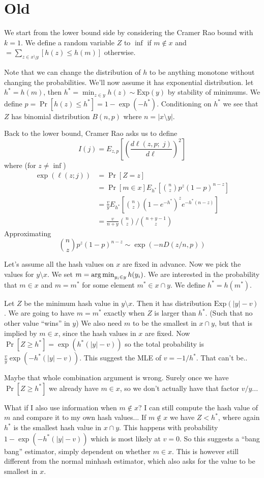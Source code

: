 \section{Old}


We start from the lower bound side by considering the Cramer Rao bound with $k=1$.
We define a random variable $Z$ to $\inf$ if $m\not\in x$ and $
= \sum_{z\in x\setminus y} [h(z) \le h(m)]$ otherwise.

Note that we can change the distribution of $h$ to be anything monotone without changing the probabilities.
We'll now assume it has exponential distribution.
let $h^* = h(m)$, then $h^* = \min_{z\in y}h(z) \sim \text{Exp}(y)$ by stability of minimums.
We define $p=\Pr[h(z)\le h^*] = 1-\exp(-h^*)$.
Conditioning on $h^*$ we see that $Z$ has binomial distribution $B(n,p)$ where $n=|x\setminus y|$.

Back to the lower bound, 
Cramer Rao asks us to define
\[
   I(j) = E_{z,p}\left[\left(\frac{d\ell(z,p;\; j)}{d\ell}\right)^2\right]
\]
where (for $z\not=\inf$)
\begin{align}
   \exp(\ell(z;j))
   &=\Pr[Z=z]
 \\&= \Pr[m\in x]E_{h^*}[\binom{n}{z}p^z(1-p)^{n-z}]
 \\&= \tfrac{v}{y}E_{h^*}[\binom{n}{z} (1-e^{-h^*})^z e^{-h^*(n-z)}]
 \\&= \frac{v}{n+y}\binom{n}{z}\bigg/\binom{n+y-1}{z}
\end{align}
Approximating
\[
   \binom{n}{z}p^z(1-p)^{n-z} \sim \exp(-n D(z/n, p))
\]


Let's assume all the hash values on $x$ are fixed in advance.
Now we pick the values for $y\setminus x$.
We set $m=\operatorname*{arg\,min}_{y_i\in y} h(y_i)$.
We are interested in the probability that $m\in x$ and $m=m^*$ for some element $m^*\in x\cap y$.
We define $h^*=h(m^*)$.

Let $Z$ be the minimum hash value in $y\setminus x$. Then it has distribution $\text{Exp}(|y|-v)$.
We are going to have $m=m^*$ exactly when $Z$ is larger than $h^*$.
(Such that no other value ``wins'' in $y$)
We also need $m$ to be the smallest in $x\cap y$, but that is implied by $m\in x$, since the hash values in $x$ are fixed.
Now $\Pr[Z \ge h^*] = \exp(h^*(|y|-v))$
so the total probability is $\frac{v}{y}\exp(-h^*(|y|-v))$.
This suggest the MLE of $v=-1/h^*$.
That can't be..

Maybe that whole combination argument is wrong.
Surely once we have $\Pr[Z\ge h^*]$ we already have $m\in x$, so we don't actually have that factor $v/y$...

What if I also use information when $m\not\in x$?
I can still compute the hash value of $m$ and compare it to my own hash values...
If $m\not\in x$ we have $Z < h^*$, where again $h^*$ is the smallest hash value in $x\cap y$.
This happens with probability $1-\exp(-h^*(|y|-v))$ which is most likely at $v=0$.
So this suggests a ``bang bang'' estimator, simply dependent on whether $m\in x$.
This is however still different from the normal minhash estimator, which also asks for the value to be smallest in $x$.

